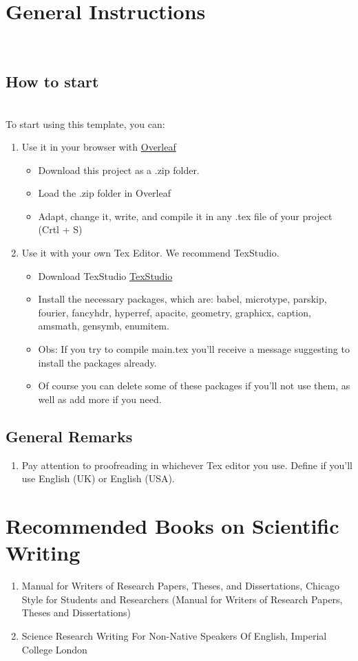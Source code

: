 \documentclass[12pt,oneside]{article}
\begin{document}
	\section{General Instructions} \\
	\subsection{How to start} \\
	To start using this template, you can:
	\begin{enumerate}
		\item Use it in your browser with \href{https://www.overleaf.com/}{Overleaf}
			\begin{itemize}
				\item Download this project as a .zip folder.
				\item Load the .zip folder in Overleaf
				\item Adapt, change it, write, and compile it in any .tex file of your project (Crtl + S)
			\end{itemize}
		\item Use it with your own Tex Editor. We recommend TexStudio.
			\begin{itemize}
				\item Download TexStudio \href{https://www.texstudio.org/}{TexStudio}
				\item Install the necessary packages, which are: babel, microtype, parskip, fourier, fancyhdr, hyperref, apacite, geometry, graphicx, caption, amsmath, gensymb, enumitem. 
				\item Obs: If you try to compile main.tex you'll receive a message suggesting to install the packages already.
				\item Of course you can delete some of these packages if you'll not use them, as well as add more if you need.
			\end{itemize} 
	\end{enumerate}

	\subsection{General Remarks}
	\begin{enumerate}
		\item Pay attention to proofreading in whichever Tex editor you use. Define if you'll use English (UK) or English (USA).

	\end{enumerate}

	\section{Recommended Books on Scientific Writing}
	\begin{enumerate}
		\item Manual for Writers of Research Papers, Theses, and Dissertations, Chicago Style for Students and Researchers (Manual for Writers of Research Papers, Theses and Dissertations)
		\item Science Research Writing For Non-Native Speakers Of English, Imperial College London
	\end{enumerate}
\end{document}
